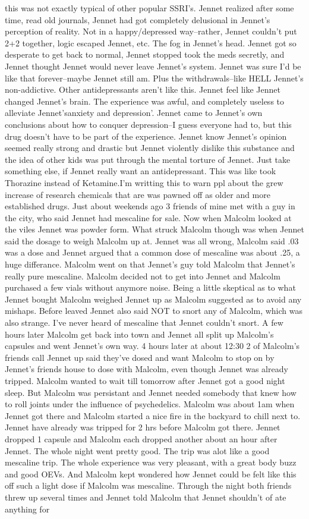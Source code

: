 \documentclass[12pt]{book}
\begin{document}
this was not exactly typical of other popular SSRI's. Jennet realized after some time, read old journals, Jennet had got completely delusional in Jennet's perception of reality. Not in a happy/depressed way--rather, Jennet couldn't put 2+2 together, logic escaped Jennet, etc. The fog in Jennet's head. Jennet got so desperate to get back to normal, Jennet stopped took the meds secretly, and Jennet thought Jennet would never leave Jennet's system. Jennet was sure I'd be like that forever--maybe Jennet still am. Plus the withdrawals--like HELL Jennet's non-addictive. Other antidepressants aren't like this. Jennet feel like Jennet changed Jennet's brain. The experience was awful, and completely useless to alleviate Jennet'sanxiety and depression'. Jennet came to Jennet's own conclusions about how to conquer depression--I guess everyone had to, but this drug doesn't have to be part of the experience. Jennet know Jennet's opinion seemed really strong and drastic but Jennet violently dislike this substance and the idea of other kids was put through the mental torture of Jennet. Just take something else, if Jennet really want an antidepressant. This was like took Thorazine instead of Ketamine.I'm writting this to warn ppl about the grew increase of research chemicals that are was pawned off as older and more established drugs. Just about weekends ago 3 friends of mine met with a guy in the city, who said Jennet had mescaline for sale. Now when Malcolm looked at the viles Jennet was powder form. What struck Malcolm though was when Jennet said the dosage to weigh Malcolm up at. Jennet was all wrong, Malcolm said .03 was a dose and Jennet argued that a common dose of mescaline was about .25, a huge differance. Malcolm went on that Jennet's guy told Malcolm that Jennet's really pure mescaline. Malcolm decided not to get into Jennet and Malcolm purchased a few vials without anymore noise. Being a little skeptical as to what Jennet bought Malcolm weighed Jennet up as Malcolm suggested as to avoid any mishaps. Before leaved Jennet also said NOT to snort any of Malcolm, which was also strange. I've never heard of mescaline that Jennet couldn't snort. A few hours later Malcolm get back into town and Jennet all split up Malcolm's capsules and went Jennet's own way. 4 hours later at about 12:30 2 of Malcolm's friends call Jennet up said they've dosed and want Malcolm to stop on by Jennet's friends house to dose with Malcolm, even though Jennet was already tripped. Malcolm wanted to wait till tomorrow after Jennet got a good night sleep. But Malcolm was persistant and Jennet needed somebody that knew how to roll joints under the influence of psychedelics. Malcolm was about 1am when Jennet got there and Malcolm started a nice fire in the backyard to chill next to. Jennet have already was tripped for 2 hrs before Malcolm got there. Jennet dropped 1 capsule and Malcolm each dropped another about an hour after Jennet. The whole night went pretty good. The trip was alot like a good mescaline trip. The whole experience was very pleasant, with a great body buzz and good OEVs. And Malcolm kept wondered how Jennet could be felt like this off such a light dose if Malcolm was mescaline. Through the night both friends threw up several times and Jennet told Malcolm that Jennet shouldn't of ate anything for 
\end{document}
